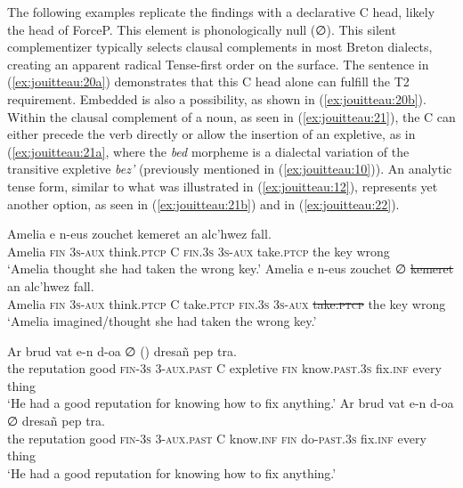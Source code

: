 \documentclass[output=paper,colorlinks,citecolor=brown]{langscibook}
\begin{document}
The following examples replicate the findings with a declarative C head, likely the head of ForceP. This element is phonologically null (∅). This silent complementizer typically selects clausal complements in most Breton dialects, creating an apparent radical Tense-first order on the surface. The sentence in (\ref{ex:jouitteau:20a}) demonstrates that this C head alone can fulfill the T2 requirement. Embedded  is also a possibility, as shown in (\ref{ex:jouitteau:20b}). Within the clausal complement of a noun, as seen in (\ref{ex:jouitteau:21}), the C can either precede the verb directly or allow the insertion of an expletive, as in (\ref{ex:jouitteau:21a}, where the \textit{bed} morpheme is a dialectal variation of the transitive expletive \textit{bez’} (previously mentioned in (\ref{ex:jouitteau:10})). An analytic tense form, similar to what was illustrated in (\ref{ex:jouitteau:12}), represents yet another option, as seen in (\ref{ex:jouitteau:21b}) and in (\ref{ex:jouitteau:22}).

\ea \label{ex:jouitteau:20}
\ea \label{ex:jouitteau:20a}
    \gll Amelia  e    n-eus      zouchet      \FirstPosition{\BoldNull}    {}         {}      kemeret     an  alc’hwez fall. \\
        Amelia \textsc{fin} \textsc{3s-aux}  think\textsc{.ptcp}   C  \textsc{fin.3s} \textsc{3s-aux}   take\textsc{.ptcp}   the key wrong \\
    \glt ‘Amelia thought she had taken the wrong key.’
    \ex \label{ex:jouitteau:20b}
    \gll Amelia  e    n-eus       zouchet    ∅      {}         {}      \sout{kemeret}      an  alc’hwez fall. \\ 
    Amelia \textsc{fin} \textsc{3s-aux}  think\textsc{.ptcp} C  take\textsc{.ptcp} \textsc{fin.3s} \textsc{3s-aux} \sout{take\textsc{.ptcp}}  the key         wrong  \\
    \glt ‘Amelia imagined/thought she had taken the wrong key.’ 
    \z 
    \z

\ea \label{ex:jouitteau:21}
\ea \label{ex:jouitteau:21a}
    \gll Ar  brud          vat     e-n        d-oa           ∅  ()  {}    {}               dresañ  pep    tra. \\
     the reputation good  \textsc{fin}-\textsc{3s} \textsc{3-aux.past}  C  expletive \textsc{fin} know\textsc{.past.3s} fix\textsc{.inf}    every thing
    \\
    \glt ‘He had a good reputation for knowing how to fix anything.’ 
    \ex \label{ex:jouitteau:21b}
    \gll  Ar  brud          vat    e-n        d-oa          ∅       {}    {}            dresañ  pep    tra. \\
    the reputation good \textsc{fin}{}-\textsc{3s} 3\textsc{{}-aux.past} C   know\textsc{.inf} \textsc{fin} do\textsc{{}-past.3s} fix\textsc{.inf}    every thing \\
    \glt ‘He had a good reputation for knowing how to fix anything.’ 
    \z 
    \z
\end{document}
